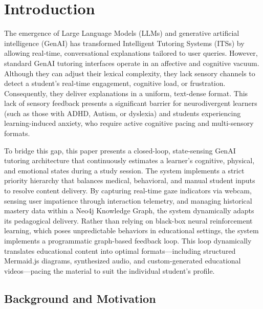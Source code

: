 \documentclass[final,5p,times,twocolumn,authoryear]{elsarticle}
\begin{document}
\section{Introduction}
\label{sec:introduction}

The emergence of Large Language Models (LLMs) and generative artificial intelligence (GenAI) has transformed Intelligent Tutoring Systems (ITSs) by allowing real-time, conversational explanations tailored to user queries. However, standard GenAI tutoring interfaces operate in an affective and cognitive vacuum. Although they can adjust their lexical complexity, they lack sensory channels to detect a student's real-time engagement, cognitive load, or frustration. Consequently, they deliver explanations in a uniform, text-dense format. This lack of sensory feedback presents a significant barrier for neurodivergent learners (such as those with ADHD, Autism, or dyslexia) and students experiencing learning-induced anxiety, who require active cognitive pacing and multi-sensory formats.

To bridge this gap, this paper presents a closed-loop, state-sensing GenAI tutoring architecture that continuously estimates a learner's cognitive, physical, and emotional states during a study session. The system implements a strict priority hierarchy that balances medical, behavioral, and manual student inputs to resolve content delivery. By capturing real-time gaze indicators via webcam, sensing user impatience through interaction telemetry, and managing historical mastery data within a Neo4j Knowledge Graph, the system dynamically adapts its pedagogical delivery. Rather than relying on black-box neural reinforcement learning, which poses unpredictable behaviors in educational settings, the system implements a programmatic graph-based feedback loop. This loop dynamically translates educational content into optimal formats—including structured Mermaid.js diagrams, synthesized audio, and custom-generated educational videos—pacing the material to suit the individual student's profile.

\subsection{Background and Motivation}
\label{subsec:bg_motivation}
\end{document}
